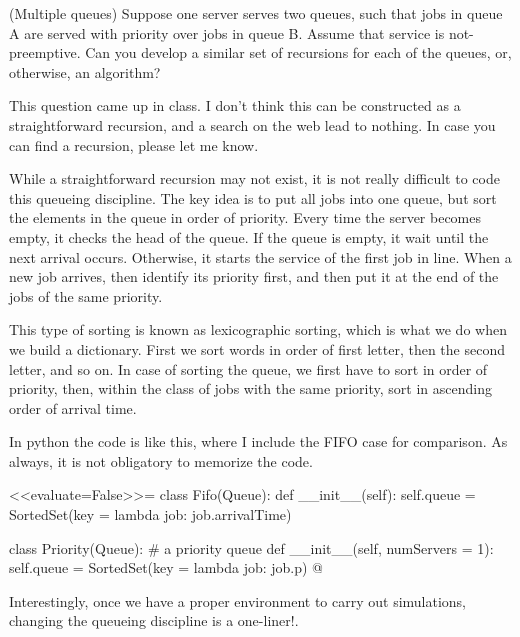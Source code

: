 \begin{question}(Multiple queues) Suppose one server serves two
  queues, such that jobs in queue A are served with priority over jobs
  in queue B. Assume that service is not-preemptive.  Can you develop
  a similar set of recursions for each of the queues, or, otherwise,
  an algorithm?
  \begin{solution}
    This question came up in class. I don't think this can be
    constructed as a straightforward recursion, and a search on the
    web lead to nothing. In case you can find a recursion, please let
    me know.  

    While a straightforward recursion may not exist, it is not really
    difficult to code this queueing discipline. The key idea is to put
    all jobs into one queue, but sort the elements in the queue in
    order of priority. Every time the server becomes empty, it checks
    the head of the queue. If the queue is empty, it wait until the
    next arrival occurs. Otherwise, it starts the service of the first
    job in line. When a new job arrives, then identify its priority
    first, and then put it at the end of the jobs of the same
    priority.

    This type of sorting is known as lexicographic sorting, which is
    what we do when we build a dictionary. First we sort words in
    order of first letter, then the second letter, and so on. In case
    of sorting the queue, we first have to sort in order of priority,
    then, within the class of jobs with the same priority, sort in
    ascending order of arrival time.

    In python the code is like this, where I include the FIFO case for
    comparison. As always, it is not obligatory to memorize the  code.

<<evaluate=False>>=
class Fifo(Queue):
    def __init__(self):
        self.queue = SortedSet(key = lambda job: job.arrivalTime)

class Priority(Queue): # a priority queue
    def __init__(self, numServers = 1):
        self.queue = SortedSet(key = lambda job: job.p)
@

Interestingly, once we have a proper environment to carry out
simulations, changing the queueing discipline is a one-liner!.

  \end{solution}
\end{question}


